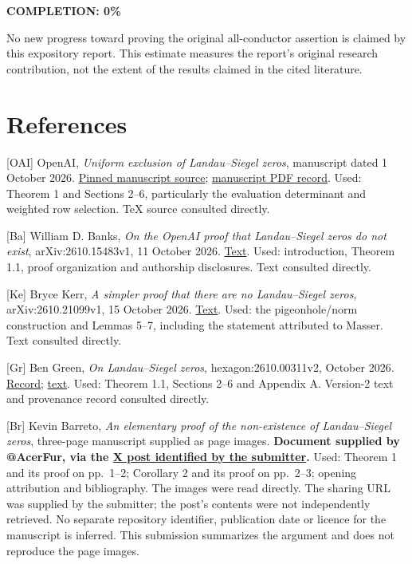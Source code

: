 \documentclass[11pt]{article}
\begin{document}
\noindent\textbf{COMPLETION: 0\%}

No new progress toward proving the original all-conductor assertion is claimed by this expository report. This estimate measures the report's original research contribution, not the extent of the results claimed in the cited literature.

\section{References}\label{references}

{[}OAI{]} OpenAI, \emph{Uniform exclusion of Landau--Siegel zeros}, manuscript dated 1 October 2026. \href{https://github.com/openai/math/blob/adc7f1241b42e322a6451854ab7e4b4c146bf78a/preprints/Uniform-exclusion-of-Landau-Siegel-zeros-October-1-2026/build/paper.tex}{Pinned manuscript source}; \href{https://github.com/openai/math/blob/adc7f1241b42e322a6451854ab7e4b4c146bf78a/preprints/Uniform-exclusion-of-Landau-Siegel-zeros-October-1-2026/paper.pdf}{manuscript PDF record}. Used: Theorem 1 and Sections 2--6, particularly the evaluation determinant and weighted row selection. TeX source consulted directly.

{[}Ba{]} William D. Banks, \emph{On the OpenAI proof that Landau--Siegel zeros do not exist}, arXiv:2610.15483v1, 11 October 2026. \href{https://arxiv.org/html/2610.15483v1}{Text}. Used: introduction, Theorem 1.1, proof organization and authorship disclosures. Text consulted directly.

{[}Ke{]} Bryce Kerr, \emph{A simpler proof that there are no Landau--Siegel zeros}, arXiv:2610.21099v1, 15 October 2026. \href{https://arxiv.org/html/2610.21099v1}{Text}. Used: the pigeonhole/norm construction and Lemmas 5--7, including the statement attributed to Masser. Text consulted directly.

{[}Gr{]} Ben Green, \emph{On Landau--Siegel zeros}, hexagon:2610.00311v2, October 2026. \href{https://hexagonmath.org/2610.00311v2}{Record}; \href{https://hexagonmath.org/pdf/2610.00311v2}{text}. Used: Theorem 1.1, Sections 2--6 and Appendix A. Version-2 text and provenance record consulted directly.

{[}Br{]} Kevin Barreto, \emph{An elementary proof of the non-existence of Landau--Siegel zeros}, three-page manuscript supplied as page images. \textbf{Document supplied by @AcerFur, via the \href{https://x.com/AcerFur/status/2112239827077026128}{X post identified by the submitter}.} Used: Theorem 1 and its proof on pp.~1--2; Corollary 2 and its proof on pp.~2--3; opening attribution and bibliography. The images were read directly. The sharing URL was supplied by the submitter; the post's contents were not independently retrieved. No separate repository identifier, publication date or licence for the manuscript is inferred. This submission summarizes the argument and does not reproduce the page images.
\end{document}
